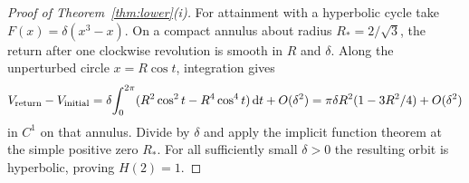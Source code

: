\begin{proof}[Proof of Theorem~\ref{thm:lower}\textup{(i)}]
For attainment with a hyperbolic cycle take $F(x)=\delta(x^3-x)$.
On a compact annulus about radius $R_*=2/\sqrt3$, the return after one
clockwise revolution is smooth in $R$ and $\delta$. Along the unperturbed
circle $x=R\cos t$, integration gives
\[
 V_{\rm return}-V_{\rm initial}
  =\delta\!\int_0^{2\pi}(R^2\cos^2t-R^4\cos^4t)\,\mathrm{d} t+O(\delta^2)
  =\pi\delta R^2(1-3R^2/4)+O(\delta^2)
\]
in $C^1$ on that annulus. Divide by $\delta$ and apply the implicit
function theorem at the simple positive zero $R_*$. For all sufficiently
small $\delta>0$ the resulting orbit is hyperbolic, proving $H(2)=1$.
\end{proof}
